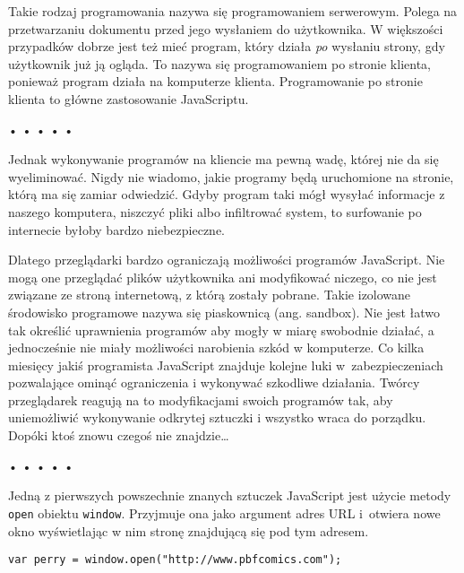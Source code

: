   
Takie rodzaj programowania nazywa się programowaniem serwerowym. Polega na przetwarzaniu dokumentu przed jego wysłaniem do użytkownika. W większości przypadków dobrze jest też mieć program, który działa \emph{po} wysłaniu strony, gdy użytkownik już ją ogląda. To nazywa się programowaniem po stronie klienta, ponieważ program działa na komputerze klienta. Programowanie po stronie klienta to główne zastosowanie JavaScriptu.



\begin{center}
• • • • •
\end{center}

  
Jednak wykonywanie programów na kliencie ma pewną wadę, której nie da się wyeliminować. Nigdy nie wiadomo, jakie programy będą uruchomione na stronie, którą ma się zamiar odwiedzić. Gdyby program taki mógł wysyłać informacje z naszego komputera, niszczyć pliki albo infiltrować system, to surfowanie po internecie byłoby bardzo niebezpieczne.

  
Dlatego przeglądarki bardzo ograniczają możliwości programów JavaScript. Nie mogą one przeglądać plików użytkownika ani modyfikować niczego, co nie jest związane ze stroną internetową, z którą zostały pobrane. Takie izolowane środowisko programowe nazywa się piaskownicą (ang. sandbox). Nie jest łatwo tak określić uprawnienia programów aby mogły w miarę swobodnie działać, a jednocześnie nie miały możliwości narobienia szkód w komputerze. Co kilka miesięcy jakiś programista JavaScript znajduje kolejne luki w~zabezpieczeniach pozwalające ominąć ograniczenia i wykonywać szkodliwe działania. Twórcy przeglądarek reagują na to modyfikacjami swoich programów tak, aby uniemożliwić wykonywanie odkrytej sztuczki i wszystko wraca do porządku. Dopóki ktoś znowu czegoś nie znajdzie…



\begin{center}
• • • • •
\end{center}

  
Jedną z pierwszych powszechnie znanych sztuczek JavaScript jest użycie metody \texttt{open} obiektu \texttt{window}. Przyjmuje ona jako argument adres URL i~otwiera nowe okno wyświetlając w nim stronę znajdującą się pod tym adresem.

  
\begin{verbatim} 
var perry = window.open("http://www.pbfcomics.com");
 \end{verbatim}
  
